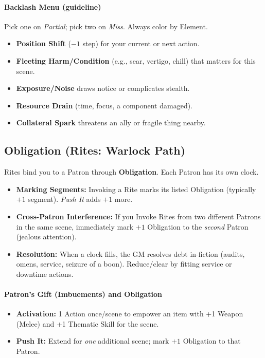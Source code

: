\paragraph{Backlash Menu (guideline)}
Pick one on \emph{Partial}; pick two on \emph{Miss}. Always color by Element.
\begin{itemize}
  \item \textbf{Position Shift} ($-1$ step) for your current or next action.
  \item \textbf{Fleeting Harm/Condition} (e.g., sear, vertigo, chill) that matters for this scene.
  \item \textbf{Exposure/Noise} draws notice or complicates stealth.
  \item \textbf{Resource Drain} (time, focus, a component damaged).
  \item \textbf{Collateral Spark} threatens an ally or fragile thing nearby.
\end{itemize}

\subsection{Obligation (Rites: Warlock Path)}
Rites bind you to a Patron through \textbf{Obligation}. Each Patron has its own clock.
\begin{itemize}
  \item \textbf{Marking Segments:} Invoking a Rite marks its listed Obligation (typically $+1$ segment). \emph{Push It} adds $+1$ more.
  \item \textbf{Cross-Patron Interference:} If you Invoke Rites from two different Patrons in the same scene, immediately mark $+1$ Obligation to the \emph{second} Patron (jealous attention).
  \item \textbf{Resolution:} When a clock fills, the GM resolves debt in-fiction (audits, omens, service, seizure of a boon). Reduce/clear by fitting service or downtime actions.
\end{itemize}

\paragraph{Patron’s Gift (Imbuements) and Obligation}
\begin{itemize}
  \item \textbf{Activation:} 1 Action once/scene to empower an item with +1 Weapon (Melee) and +1 Thematic Skill for the scene.
  \item \textbf{Push It:} Extend for \emph{one} additional scene; mark $+1$ Obligation to that Patron.
\end{itemize}

